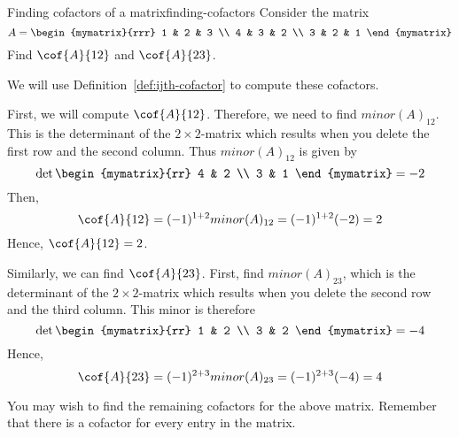 \begin{example}{Finding cofactors of a matrix}{finding-cofactors}
  Consider the matrix
  \begin{equation*}
    A=\begin{mymatrix}{rrr}
      1 & 2 & 3 \\
      4 & 3 & 2 \\
      3 & 2 & 1
    \end{mymatrix} 
  \end{equation*}
  Find $\cof{A}{12}$ and $\cof{A}{23}$.
\end{example}

\begin{solution}
  We will use Definition~\ref{def:ijth-cofactor} to compute these
  cofactors.

  First, we will compute $\cof{A}{12}$.  Therefore, we need to
  find $minor(A)_{12}$. This is the determinant of the
  $2\times 2$-matrix which results when you delete the first row and
  the second column. Thus $minor(A)_{12}$ is given by
  \begin{equation*}
    \det \begin{mymatrix}{rr}
      4 & 2 \\
      3 & 1
    \end{mymatrix} = -2
  \end{equation*}
  Then,
  \begin{equation*}
    \cof{A}{12}=(-1) ^{1+2} minor(A)_{12} =(-1) ^{1+2}(-2) =2
  \end{equation*}
  Hence, $\cof{A}{12}=2$.

  Similarly, we can find $\cof{A}{23}$. First, find
  $minor(A)_{23}$, which is the determinant of the $2\times 2$-matrix
  which results when you delete the second row and the third
  column. This minor is therefore
  \begin{equation*}
    \det \begin{mymatrix}{rr}
      1 & 2 \\
      3 & 2
    \end{mymatrix} = -4
  \end{equation*}
  Hence,
  \begin{equation*}
    \cof{A}{23}=(-1) ^{2+3} minor(A)_{23} =(-1) ^{2+3}(-4) =4
  \end{equation*}
\end{solution}

You may wish to find the remaining cofactors for the above
matrix. Remember that there is a cofactor for every entry in the
matrix.


